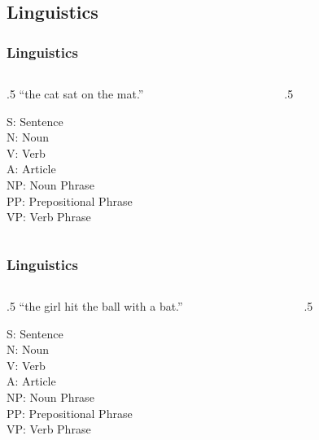 \documentclass[10pt]{beamer}
\begin{document}
\subsection{Linguistics}
\begin{frame}[t,fragile] \frametitle{Linguistics}
	\begin{columns}[T] %
	\begin{column}{.5\linewidth} %
		``the cat sat on the mat.''\\
		
		\vspace{1cm}
		
		
		S: Sentence\\
		N: Noun\\
		V: Verb\\
		A: Article\\
		NP: Noun Phrase\\
		PP: Prepositional Phrase\\
		VP: Verb Phrase\\
		
		
		
	\end{column} %
	\begin{column}{.5\linewidth} %
	{\small 
		
	}
	\end{column} %
	\end{columns} %
\end{frame}




\begin{frame}[t,fragile] \frametitle{Linguistics}
	\begin{columns}[T] %
	\begin{column}{.5\linewidth} %
		``the girl hit the ball with a bat.''\\
		
		\vspace{1cm}
		
		S: Sentence\\
		N: Noun\\
		V: Verb\\
		A: Article\\
		NP: Noun Phrase\\
		PP: Prepositional Phrase\\
		VP: Verb Phrase\\
		
		
		
	\end{column} %
	\begin{column}{.5\linewidth} %
	{\small 
		
	}
	\end{column} %
	\end{columns} %
\end{frame}
\end{document}
